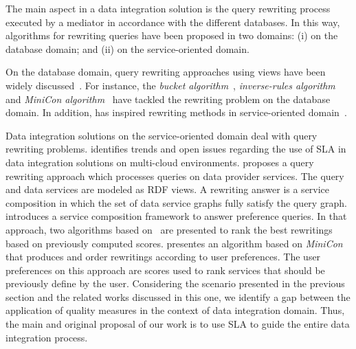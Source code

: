The main aspect in a data integration solution is 
the query rewriting process executed by a mediator
in accordance with the different databases.
%
In this way, algorithms for rewriting queries have
been proposed in two domains: (i) on the database 
domain; and (ii) on the service-oriented domain.

On the database domain, query rewriting approaches using
views have been widely discussed~\cite{Halevy:2001}.
%
For instance, the \textit{bucket algorithm}~\cite{Levy:1996}, 
\textit{inverse-rules algorithm}~\cite{Duschka:1997} and 
\textit{MiniCon algorithm}~\cite{Pottinger:2001} have
tackled the rewriting problem on the database domain.
%
In addition, \cite{Pottinger:2001} has inspired rewriting methods in service-oriented domain~\cite{costa2013,ba2014}.

Data integration solutions on the 
service-oriented domain deal with query rewriting problems. \cite{Carvalho2015} identifies
trends and open issues regarding the use of SLA in data integration solutions on
multi-cloud environments.
%
\cite{Barhamgi2010} proposes a query rewriting approach 
which processes queries on data provider services.
The query and data services are modeled as RDF views.
A rewriting answer is a service composition in which 
the set of data service graphs fully satisfy the query graph.  
%
\cite{Benouaret2011} introduces a service composition
framework to answer preference queries. In that approach, two algorithms based
on~\cite{Barhamgi2010} are presented to rank the best rewritings based on previously computed scores.
%
\cite{ba2014} presentes an algorithm based on \textit{MiniCon} 
that produces and order rewritings according to user preferences. 
The user preferences on this approach are scores used to rank 
services that should be previously define by the user. 
%
Considering the scenario presented in the previous section and the related works
discussed in this one, we identify a gap between the application of quality
measures in the context of data integration domain. Thus, the main
and original proposal of our work is to use SLA to guide the entire data integration process.

